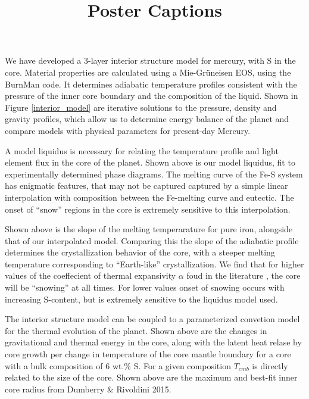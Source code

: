\documentclass[a4paper,10pt]{article}
\title{Poster Captions}
\author{}
\date{}
\begin{document}
\maketitle


We have developed a 3-layer interior structure model for mercury, with S in the core.
Material properties are calculated using a Mie-Gr\"{u}neisen EOS, using the BurnMan
code. It determines adiabatic temperature profiles consistent with the pressure of the 
inner core boundary and the composition of the liquid. Shown in Figure \ref{interior_model} 
are iterative solutions to the pressure, density and gravity profiles, which allow us 
to determine energy balance of the planet and compare models with physical parameters 
for present-day Mercury.

A model liquidus is necessary for relating the temperature profile and light element
flux in the core of the planet. Shown above is our model liquidus, fit to
experimentally determined phase diagrams. The melting curve of the Fe-S system has
enigmatic features, that may not be captured captured by a simple linear
interpolation with composition between the Fe-melting curve and eutectic. The onset
of ``snow'' regions in the core is extremely sensitive to this interpolation.

Shown above is the slope of the melting temperarature for pure iron, alongside that
of our interpolated model. Comparing this the slope of the adiabatic profile
determines the crystallization behavior of the core, with a steeper melting
temperature corresponding to  ``Earth-like'' crystallization. We find that for higher
values of the coeffecient of thermal expansivity $\alpha$ foud in the literature
, the core will be ``snowing'' at all times. For lower values
onset of snowing occurs with increasing S-content, but is extremely sensitive to the
liquidus model used.

The interior structure model can be coupled to a parameterized convetion model for
the thermal evolution of the planet. Shown above are the changes in gravitational
and thermal energy in the core, along with the latent heat relase by core growth per
change in temperature of the core mantle boundary for a core with a bulk composition
of 6 wt.\% S. For a given composition $T_{cmb}$ is directly related to the size of
the core. Shown above are the maximum and best-fit inner core radius from
Dumberry \& Rivoldini 2015.
\end{document}
